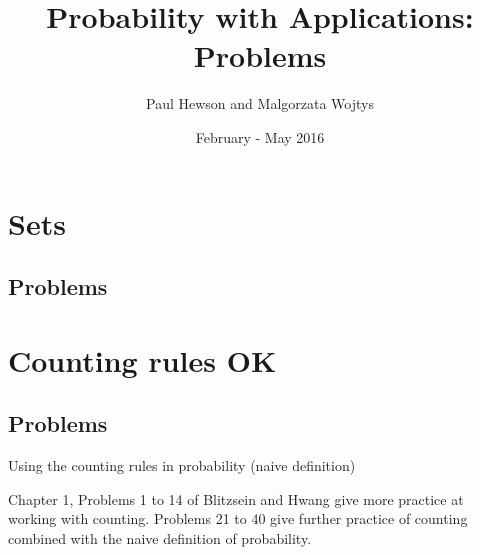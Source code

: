 \documentclass[12pt]{extbook}
\title{Probability with Applications: Problems}
\author{Paul Hewson and Malgorzata Wojtys}
\date{February - May 2016}
\begin{document}
\sffamily
\onehalfspacing

\maketitle

\setcounter{chapter}{1}
\chapter{Sets}

\section{Problems}
\begin{enumerate}


%
%

\end{enumerate}


\setcounter{chapter}{3}


\chapter{Counting rules OK}



\section{Problems}

\begin{enumerate}







\end{enumerate}


Using the counting rules in probability (naive definition)

\begin{enumerate}

\end{enumerate}


Chapter 1, Problems 1 to 14 of Blitzsein and Hwang give more practice at working with counting.  Problems 21 to 40 give further practice of counting combined with the naive definition of probability.  
\end{document}
